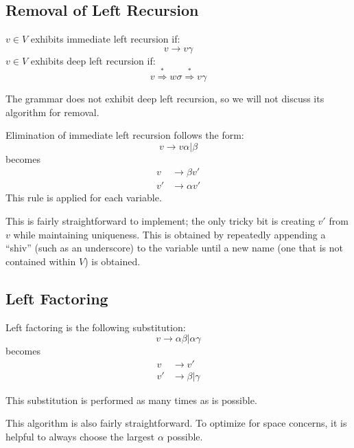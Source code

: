 \documentclass[titlepage]{article}
\newcommand{\deriv}{\overset{*}{\Rightarrow}}
\begin{document}
		\subsection{Removal of Left Recursion}
		$v \in V$ exhibits immediate left recursion if:
			\[ v \rightarrow v\gamma \]
		$v \in V$ exhibits deep left recursion if:
			\[ v \deriv w\sigma \deriv v\gamma \]

		The grammar does not exhibit deep left recursion, so we will not discuss its algorithm for removal.

		Elimination of immediate left recursion follows the form:
			\[ v \rightarrow v\alpha | \beta \]
		becomes
			\begin{align*}
				v  &\rightarrow \beta v' \\
				v' &\rightarrow \alpha v'
			\end{align*}
		This rule is applied for each variable.

		This is fairly straightforward to implement; the only tricky bit is creating $v'$ from $v$ while maintaining uniqueness. This is obtained by repeatedly appending a ``shiv'' (such as an underscore) to the variable until a new name (one that is not contained within $V$) is obtained.
		
		\subsection{Left Factoring}
		Left factoring is the following substitution:
			\[ v \rightarrow \alpha\beta | \alpha\gamma \]
		becomes
			\begin{align*}
				v  &\rightarrow v' \\
				v' &\rightarrow \beta | \gamma
			\end{align*}

		This substitution is performed as many times as is possible.

		This algorithm is also fairly straightforward. To optimize for space concerns, it is helpful to always choose the largest $\alpha$ possible.
		
\end{document}
